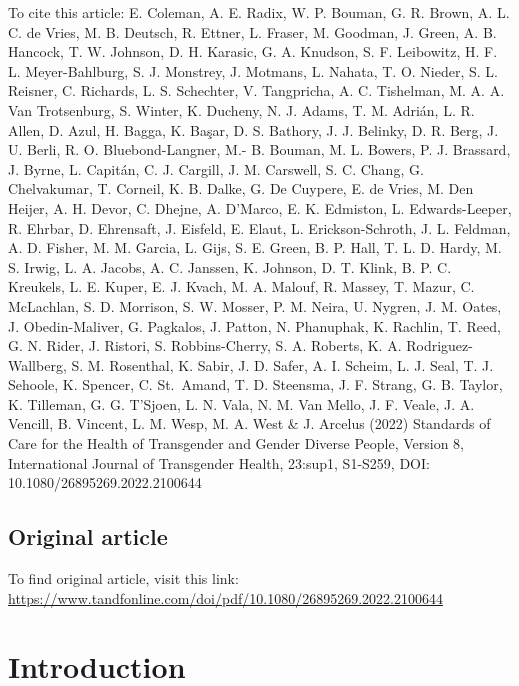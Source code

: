 \documentclass[
]{book}
\begin{document}
To cite this article: E. Coleman, A. E. Radix, W. P. Bouman, G. R. Brown, A. L. C. de Vries, M. B.
Deutsch, R. Ettner, L. Fraser, M. Goodman, J. Green, A. B. Hancock, T. W. Johnson, D. H. Karasic,
G. A. Knudson, S. F. Leibowitz, H. F. L. Meyer-Bahlburg, S. J. Monstrey, J. Motmans, L. Nahata,
T. O. Nieder, S. L. Reisner, C. Richards, L. S. Schechter, V. Tangpricha, A. C. Tishelman, M. A.
A. Van Trotsenburg, S. Winter, K. Ducheny, N. J. Adams, T. M. Adrián, L. R. Allen, D. Azul, H.
Bagga, K. Başar, D. S. Bathory, J. J. Belinky, D. R. Berg, J. U. Berli, R. O. Bluebond-Langner, M.-
B. Bouman, M. L. Bowers, P. J. Brassard, J. Byrne, L. Capitán, C. J. Cargill, J. M. Carswell, S. C.
Chang, G. Chelvakumar, T. Corneil, K. B. Dalke, G. De Cuypere, E. de Vries, M. Den Heijer, A.
H. Devor, C. Dhejne, A. D'Marco, E. K. Edmiston, L. Edwards-Leeper, R. Ehrbar, D. Ehrensaft,
J. Eisfeld, E. Elaut, L. Erickson-Schroth, J. L. Feldman, A. D. Fisher, M. M. Garcia, L. Gijs, S. E.
Green, B. P. Hall, T. L. D. Hardy, M. S. Irwig, L. A. Jacobs, A. C. Janssen, K. Johnson, D. T. Klink,
B. P. C. Kreukels, L. E. Kuper, E. J. Kvach, M. A. Malouf, R. Massey, T. Mazur, C. McLachlan, S.
D. Morrison, S. W. Mosser, P. M. Neira, U. Nygren, J. M. Oates, J. Obedin-Maliver, G. Pagkalos,
J. Patton, N. Phanuphak, K. Rachlin, T. Reed, G. N. Rider, J. Ristori, S. Robbins-Cherry, S. A.
Roberts, K. A. Rodriguez-Wallberg, S. M. Rosenthal, K. Sabir, J. D. Safer, A. I. Scheim, L. J. Seal,
T. J. Sehoole, K. Spencer, C. St.~Amand, T. D. Steensma, J. F. Strang, G. B. Taylor, K. Tilleman,
G. G. T'Sjoen, L. N. Vala, N. M. Van Mello, J. F. Veale, J. A. Vencill, B. Vincent, L. M. Wesp, M.
A. West \& J. Arcelus (2022) Standards of Care for the Health of Transgender and Gender
Diverse People, Version 8, International Journal of Transgender Health, 23:sup1, S1-S259, DOI:
10.1080/26895269.2022.2100644

\hypertarget{original-article}{%
\section*{Original article}\label{original-article}}

To find original article, visit this link: \url{https://www.tandfonline.com/doi/pdf/10.1080/26895269.2022.2100644}

\hypertarget{introduction}{%
\chapter*{Introduction}\label{introduction}}
\end{document}
